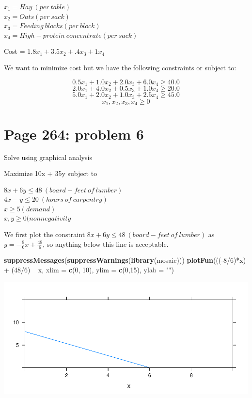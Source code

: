 \documentclass[]{article}
\newenvironment{Shaded}{\begin{snugshade}}{\end{snugshade}}
\newcommand{\KeywordTok}[1]{\textcolor[rgb]{0.13,0.29,0.53}{\textbf{{#1}}}}
\newcommand{\DataTypeTok}[1]{\textcolor[rgb]{0.13,0.29,0.53}{{#1}}}
\newcommand{\DecValTok}[1]{\textcolor[rgb]{0.00,0.00,0.81}{{#1}}}
\newcommand{\StringTok}[1]{\textcolor[rgb]{0.31,0.60,0.02}{{#1}}}
\newcommand{\NormalTok}[1]{{#1}}
\begin{document}
\(x_1 = Hay~(per~table)\)\\
\(x_2 = Oats(per~sack)\)\\
\(x_3 = Feeding~blocks(per~block)\)\\
\(x_4 = High-protein~concentrate(per~sack)\)

Cost = \(1.8x_1 + 3.5x_2 + .4x_3 + 1x_4\)

We want to minimize cost but we have the following constraints or
subject to:

\[0.5x_1 + 1.0x_2 + 2.0x_3 + 6.0x_4 \geq 40.0\]
\[2.0x_1 + 4.0x_2 + 0.5x_3 + 1.0x_4 \geq 20.0\]
\[5.0x_1 + 2.0x_2 + 1.0x_3 + 2.5x_4 \geq 45.0\]
\[x_1, x_2, x_3, x_4 \geq 0\]

\section{Page 264: problem 6}\label{page-264-problem-6}

Solve using graphical analysis

Maximize 10x + 35y subject to

\(8x + 6y \leq 48 ~(board-feet~of~lumber)\)\\
\(4x - y \leq 20 ~ (hours~of~carpentry)\)\\
\(x \geq 5 (demand)\)\\
\(x,y \geq 0 (nonnegativity\)

We first plot the constraint \(8x + 6y \leq 48 ~(board-feet~of~lumber)\)
as \(y = -\frac{8}{6}x + \frac{48}{6}\), so anything below this line is
acceptable.

\begin{Shaded}
\begin{Highlighting}[]
\KeywordTok{suppressMessages}\NormalTok{(}\KeywordTok{suppressWarnings}\NormalTok{(}\KeywordTok{library}\NormalTok{(mosaic)))}
\KeywordTok{plotFun}\NormalTok{(((-}\DecValTok{8}\NormalTok{/}\DecValTok{6}\NormalTok{)*x) +}\StringTok{ }\NormalTok{(}\DecValTok{48}\NormalTok{/}\DecValTok{6}\NormalTok{) ~}\StringTok{ }\NormalTok{x, }\DataTypeTok{xlim =} \KeywordTok{c}\NormalTok{(}\DecValTok{0}\NormalTok{, }\DecValTok{10}\NormalTok{), }\DataTypeTok{ylim =} \KeywordTok{c}\NormalTok{(}\DecValTok{0}\NormalTok{,}\DecValTok{15}\NormalTok{), }\DataTypeTok{ylab =} \StringTok{""}\NormalTok{)}
\end{Highlighting}
\end{Shaded}

\includegraphics{Christophe_Hunt_hw6_files/figure-latex/unnamed-chunk-1-1.pdf}
\end{document}
